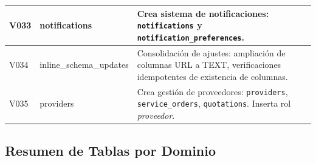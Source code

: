 \begin{longtable}{|p{}|p{}|p{}|}
V033 & notifications & Crea sistema de notificaciones: \texttt{notifications} y \texttt{notification\_preferences}. \\ \hline

V034 & inline\_schema\_updates & Consolidación de ajustes: ampliación de columnas URL a TEXT, verificaciones idempotentes de existencia de columnas. \\ \hline

V035 & providers & Crea gestión de proveedores: \texttt{providers}, \texttt{service\_orders}, \texttt{quotations}. Inserta rol \textit{proveedor}. \\ \hline

\end{longtable}

\subsection{Resumen de Tablas por Dominio}

